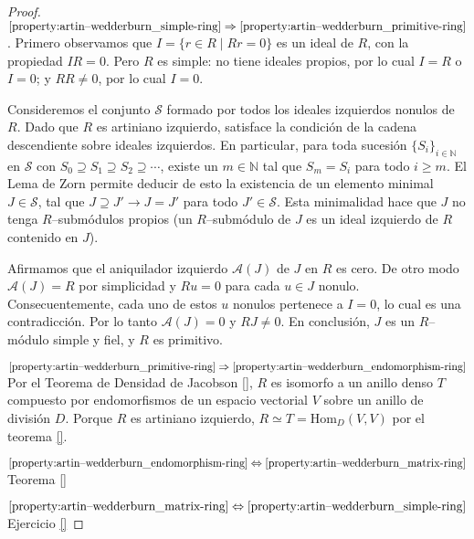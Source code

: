 \documentclass{report}
\newcommand{\naturalNumbers}{\mathbb{N}}
\newcommand{\Hom}{\text{Hom}}
\begin{document}
  \begin{proof}
    \(\ref{property:artin--wedderburn_simple-ring} \Rightarrow \ref{property:artin--wedderburn_primitive-ring}\).
    Primero observamos que \(I = \{r \in R \mid R r = 0\}\) es un ideal de \(R\), con la propiedad \(I R = 0\).
    Pero \(R\) es simple: no tiene ideales propios, por lo cual \(I = R\) o \(I = 0\);
    y \(R R \neq 0\), por lo cual \(I = 0\).

    Consideremos el conjunto \(\mathcal{S}\) formado por todos los ideales izquierdos nonulos de \(R\).
    Dado que \(R\) es artiniano izquierdo, satisface la condición de la cadena descendiente sobre ideales izquierdos.
    En particular, para toda sucesión \(\{S_i\}_{i \in \naturalNumbers}\) en \(\mathcal{S}\) con \(S_0 \supseteq S_1 \supseteq S_2 \supseteq \cdots\), existe un \(m \in \naturalNumbers\) tal que \(S_m = S_i\) para todo \(i \geq m\).
    El Lema de Zorn permite deducir de esto la existencia de un elemento minimal \(J \in \mathcal{S}\), tal que \(J \supseteq J' \rightarrow J = J'\) para todo \(J' \in \mathcal{S}\).
    Esta minimalidad hace que \(J\) no tenga \(R\)--submódulos propios (un \(R\)--submódulo de \(J\) es un ideal izquierdo de \(R\) contenido en \(J\)).

    Afirmamos que el aniquilador izquierdo \(\mathcal{A}(J)\) de \(J\) en \(R\) es cero.
    De otro modo \(\mathcal{A}(J) = R\) por simplicidad y \(R u = 0\) para cada \(u \in J\) nonulo.
    Consecuentemente, cada uno de estos \(u\) nonulos pertenece a \(I = 0\), lo cual es una contradicción.
    Por lo tanto \(\mathcal{A}(J) = 0\) y \(R J \neq 0\).
    En conclusión, \(J\) es un \(R\)--módulo simple y fiel, y \(R\) es primitivo.

    \(\ref{property:artin--wedderburn_primitive-ring} \Rightarrow \ref{property:artin--wedderburn_endomorphism-ring}\)
    Por el Teorema de Densidad de Jacobson \ref{}, \(R\) es isomorfo a un anillo denso \(T\) compuesto por endomorfismos de un espacio vectorial \(V\) sobre un anillo de división \(D\).
    Porque \(R\) es artiniano izquierdo, \(R \simeq T = \Hom _D(V, V)\) por el teorema \ref{}.

    \(\ref{property:artin--wedderburn_endomorphism-ring} \Leftrightarrow \ref{property:artin--wedderburn_matrix-ring}\)
    Teorema \ref{}

    \(\ref{property:artin--wedderburn_matrix-ring} \Leftrightarrow \ref{property:artin--wedderburn_simple-ring}\)
    Ejercicio \ref{}
  \end{proof}
\end{document}
